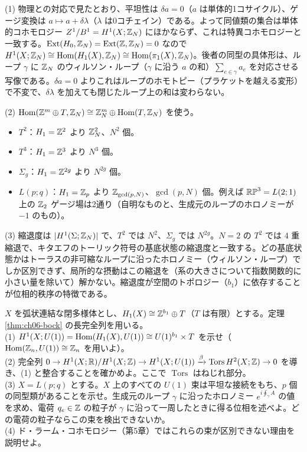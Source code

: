 \begin{solution}
(1) 物理との対応で見たとおり、平坦性は $\delta a=0$（$a$ は単体的1コサイクル）、ゲージ変換は $a\mapsto a+\delta\lambda$（$\lambda$ は0コチェイン）である。よって同値類の集合は単体的コホモロジー $Z^1/B^1=H^1(X;\mathbb{Z}_N)$ にほかならず、これは特異コホモロジーと一致する。$\operatorname{Ext}(H_0,\mathbb{Z}_N)=\operatorname{Ext}(\mathbb{Z},\mathbb{Z}_N)=0$ なので $H^1(X;\mathbb{Z}_N)\cong\operatorname{Hom}(H_1(X),\mathbb{Z}_N)\cong\operatorname{Hom}(\pi_1(X),\mathbb{Z}_N)$。後者の同型の具体形は、ループ $\gamma$ に $\mathbb{Z}_N$ のウィルソン・ループ（$\gamma$ に沿う $a$ の和）$\sum_{e\in\gamma}a_e$ を対応させる写像である。$\delta a=0$ よりこれはループのホモトピー（プラケットを越える変形）で不変で、$\delta\lambda$ を加えても閉じたループ上の和は変わらない。

(2) $\operatorname{Hom}(\mathbb{Z}^m\oplus T,\mathbb{Z}_N)\cong\mathbb{Z}_N^m\oplus\operatorname{Hom}(T,\mathbb{Z}_N)$ を使う。
\begin{itemize}
\item $T^2$：$H_1=\mathbb{Z}^2$ より $\mathbb{Z}_N^2$、$N^2$ 個。
\item $T^3$：$H_1=\mathbb{Z}^3$ より $N^3$ 個。
\item $\Sigma_g$：$H_1=\mathbb{Z}^{2g}$ より $N^{2g}$ 個。
\item $L(p;q)$：$H_1=\mathbb{Z}_p$ より $\mathbb{Z}_{\gcd(p,N)}$、$\gcd(p,N)$ 個。例えば $\mathbb{RP}^3=L(2;1)$ 上の $\mathbb{Z}_2$ ゲージ場は2通り（自明なものと、生成元のループのホロノミーが $-1$ のもの）。
\end{itemize}

(3) 縮退度は $\lvert H^1(\Sigma;\mathbb{Z}_N)\rvert$ で、$T^2$ では $N^2$、$\Sigma_g$ では $N^{2g}$。$N=2$ の $T^2$ では $4$ 重縮退で、キタエフのトーリック符号の基底状態の縮退度と一致する。どの基底状態かはトーラスの非可縮なループに沿ったホロノミー（ウィルソン・ループ）でしか区別できず、局所的な摂動はこの縮退を（系の大きさについて指数関数的に小さい量を除いて）解かない。縮退度が空間のトポロジー（$b_1$）に依存することが位相的秩序の特徴である。
\end{solution}

\begin{problem}[難易度 D]\label{ch06-prob-torsion}
$X$ を弧状連結な閉多様体とし、$H_1(X)\cong\mathbb{Z}^{b_1}\oplus T$（$T$ は有限）とする。定理 \ref{thm:ch06-bock} の長完全列を用いる。\\
(1) $H^1(X;U(1))=\operatorname{Hom}(H_1(X),U(1))\cong U(1)^{b_1}\times T$ を示せ（$\operatorname{Hom}(\mathbb{Z}_n,U(1))\cong\mathbb{Z}_n$ を用いよ）。\\
(2) 完全列 $0\to H^1(X;\mathbb{R})/H^1(X;\mathbb{Z})\to H^1(X;U(1))\xrightarrow{\beta}\operatorname{Tors}H^2(X;\mathbb{Z})\to0$ を導き、(1) と整合することを確かめよ。ここで $\operatorname{Tors}$ はねじれ部分。\\
(3) $X=L(p;q)$ とする。$X$ 上のすべての $U(1)$ 束は平坦な接続をもち、$p$ 個の同型類があることを示せ。生成元のループ $\gamma$ に沿ったホロノミー $e^{i\oint_\gamma A}$ の値を求め、電荷 $q_e\in\mathbb{Z}$ の粒子が $\gamma$ に沿って一周したときに得る位相を述べよ。どの電荷の粒子ならこの束を検出できないか。\\
(4) ド・ラーム・コホモロジー（第5章）ではこれらの束が区別できない理由を説明せよ。
\end{problem}

